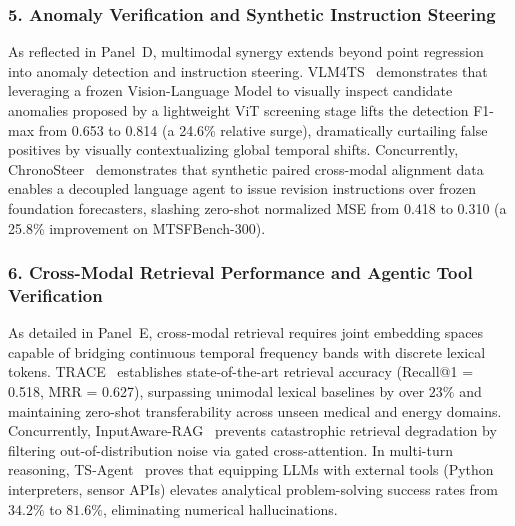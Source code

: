 \subsubsection{5. Anomaly Verification and Synthetic Instruction Steering}
As reflected in Panel~D, multimodal synergy extends beyond point regression into anomaly detection and instruction steering. VLM4TS~\cite{Li2026VLM4TS} demonstrates that leveraging a frozen Vision-Language Model to visually inspect candidate anomalies proposed by a lightweight ViT screening stage lifts the detection F1-max from 0.653 to 0.814 (a 24.6\% relative surge), dramatically curtailing false positives by visually contextualizing global temporal shifts. Concurrently, ChronoSteer~\cite{Wang2025ChronoSteer} demonstrates that synthetic paired cross-modal alignment data enables a decoupled language agent to issue revision instructions over frozen foundation forecasters, slashing zero-shot normalized MSE from 0.418 to 0.310 (a 25.8\% improvement on MTSFBench-300).

\subsubsection{6. Cross-Modal Retrieval Performance and Agentic Tool Verification}
As detailed in Panel~E, cross-modal retrieval requires joint embedding spaces capable of bridging continuous temporal frequency bands with discrete lexical tokens. TRACE~\cite{Chen2025TRACE} establishes state-of-the-art retrieval accuracy (Recall@1 = 0.518, MRR = 0.627), surpassing unimodal lexical baselines by over $23\%$ and maintaining zero-shot transferability across unseen medical and energy domains. Concurrently, InputAware-RAG~\cite{Lee2026RAG} prevents catastrophic retrieval degradation by filtering out-of-distribution noise via gated cross-attention. In multi-turn reasoning, TS-Agent~\cite{Liu2025TSAgent} proves that equipping LLMs with external tools (Python interpreters, sensor APIs) elevates analytical problem-solving success rates from $34.2\%$ to $81.6\%$, eliminating numerical hallucinations.

